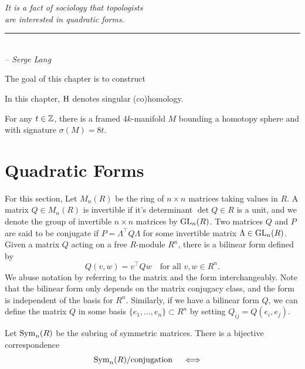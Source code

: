 \begin{flushleft}
	\textsl{It is a fact of sociology that topologists}\\
	\textsl{are interested in quadratic forms.}\\
	\rule[0pt]{17em}{0.5pt}\\
	\textsl{-- Serge Lang}
	\vspace{2em}
\end{flushleft}

The goal of this chapter is to construct 

\begin{convention*}
	In this chapter, $\operatorname{H}$ denotes singular (co)homology.
\end{convention*}

\begin{theorem}\label{thm:signature_8_existence_theorem}
	For any $t\in \mathbb{Z}$, there is a framed $4k$-manifold $M$ bounding a homotopy sphere and with signature $\sigma(M)=8t$.
\end{theorem}

\begin{theorem}
\end{theorem}

\section{Quadratic Forms}

For this section, 
Let $M_n(R)$ be the ring of $n\times n$ matrices taking values in $R$. A matrix $Q\in M_n(R)$ is invertible if it's determinant $\det Q\in R$ is a unit, and we denote the group of invertible $n\times n$ matrices by ${\operatorname{GL}}_n(R)$. Two matrices $Q$ and $P$ are said to be conjugate if $P = \Lambda^\intercal Q\Lambda$ for some invertible matrix $\Lambda\in {\operatorname{GL}}_n(R)$. Given a matrix $Q$ acting on a free $R$-module $R^n$, there is a bilinear form defined by
\[
	Q(v,w) = v^\intercal Q w\quad \textrm{for all }v,w\in R^n.
\]
We abuse notation by referring to the matrix and the form interchangeably.
Note that the bilinear form only depends on the matrix conjugacy class, and the form is independent of the basis for $R^n$.
Similarly, if we have a bilinear form $Q$, we can define the matrix $Q$ in some basis $\{e_1,\ldots, e_n\}\subset R^n$ by setting $Q_{ij}= Q(e_i, e_j)$. 

Let $\operatorname{\operatorname{Sym}}_n(R)$ be the subring of symmetric matrices. There is a bijective correspondence
\[
	\operatorname{\operatorname{Sym}}_n(R) / \textrm{conjugation} \quad\iff\quad 
\]

\begin{definition}
\end{definition}

